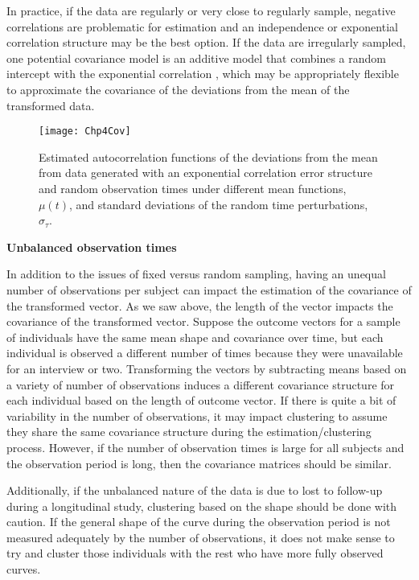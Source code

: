 In practice, if the data are regularly or very close to regularly sample, negative correlations are problematic for estimation and an independence or exponential correlation structure may be the best option. If the data are irregularly sampled, one potential covariance model is an additive model that combines a random intercept with the exponential correlation \cite{diggle2002}, which may be appropriately flexible to approximate the covariance of the deviations from the mean of the transformed data.\\

\begin{landscape}
\begin{figure}
\centering
\texttt{[image: Chp4Cov]}
\caption{Estimated autocorrelation functions of the deviations from the mean from data generated with an exponential correlation error structure and random observation times under different mean functions, $\mu(t)$, and standard deviations of the random time perturbations, $\sigma_{\tau}$.}
\label{fig:cov}
\end{figure}
\end{landscape}

\noindent \textbf{Unbalanced observation times}

In addition to the issues of fixed versus random sampling, having an unequal number of observations per subject can impact the estimation of the covariance of the transformed vector. As we saw above, the length of the vector impacts the covariance of the transformed vector. Suppose the outcome vectors for a sample of individuals have the same mean shape and covariance over time, but each individual is observed a different number of times because they were unavailable for an interview or two. Transforming the vectors by subtracting means based on a variety of number of observations induces a different covariance structure for each individual based on the length of outcome vector. If there is quite a bit of variability in the number of observations, it may impact clustering to assume they share the same covariance structure during the estimation/clustering process. However, if the number of observation times is large for all subjects and the observation period is long, then the covariance matrices should be similar. 

Additionally, if the unbalanced nature of the data is due to lost to follow-up during a longitudinal study, clustering based on the shape should be done with caution. If the general shape of the curve during the observation period is not measured adequately by the number of observations, it does not make sense to try and cluster those individuals with the rest who have more fully observed curves. 



